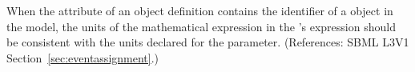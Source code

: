 When the  attribute of an \EventAssignment object
definition contains the identifier of a \Parameter object in the model, the
units of the mathematical expression in the \EventAssignment's 
expression should be consistent with the units declared for the parameter.
(References: SBML L3V1 Section~\ref{sec:eventassignment}.)

